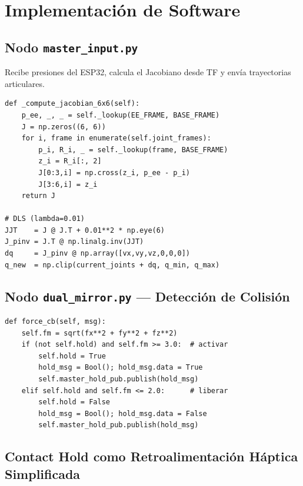 \documentclass[journal,10pt,twoside]{IEEEtran}
\begin{document}
\section{Implementación de Software}
\label{sec:impl}

\subsection{Nodo \texttt{master\_input.py}}

Recibe presiones del ESP32, calcula el Jacobiano desde TF y
envía trayectorias articulares.

\begin{lstlisting}[caption={Jacobiano + DLS en master\_input.py}]
def _compute_jacobian_6x6(self):
    p_ee, _, _ = self._lookup(EE_FRAME, BASE_FRAME)
    J = np.zeros((6, 6))
    for i, frame in enumerate(self.joint_frames):
        p_i, R_i, _ = self._lookup(frame, BASE_FRAME)
        z_i = R_i[:, 2]
        J[0:3,i] = np.cross(z_i, p_ee - p_i)
        J[3:6,i] = z_i
    return J

# DLS (lambda=0.01)
JJT    = J @ J.T + 0.01**2 * np.eye(6)
J_pinv = J.T @ np.linalg.inv(JJT)
dq     = J_pinv @ np.array([vx,vy,vz,0,0,0])
q_new  = np.clip(current_joints + dq, q_min, q_max)
\end{lstlisting}

\subsection{Nodo \texttt{dual\_mirror.py} — Detección de Colisión}

\begin{lstlisting}[caption={Lógica de contacto con histéresis}]
def force_cb(self, msg):
    self.fm = sqrt(fx**2 + fy**2 + fz**2)
    if (not self.hold) and self.fm >= 3.0:  # activar
        self.hold = True
        hold_msg = Bool(); hold_msg.data = True
        self.master_hold_pub.publish(hold_msg)
    elif self.hold and self.fm <= 2.0:      # liberar
        self.hold = False
        hold_msg = Bool(); hold_msg.data = False
        self.master_hold_pub.publish(hold_msg)
\end{lstlisting}

\subsection{Contact Hold como Retroalimentación Háptica Simplificada}
\label{sec:haptic}
\end{document}
